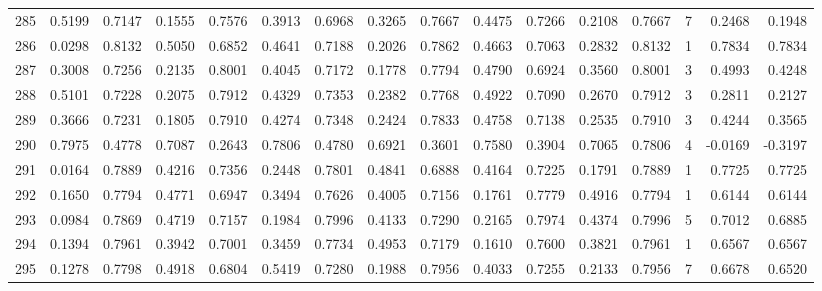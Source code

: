 \begin{tabular}{lrrrrrrrrrrrrrrr}
285 &      0.5199 &  0.7147 &  0.1555 &  0.7576 &  0.3913 &  0.6968 &  0.3265 &  0.7667 &  0.4475 &  0.7266 &   0.2108 &     0.7667 &      7 &                    0.2468 &                     0.1948 \\
286 &      0.0298 &  0.8132 &  0.5050 &  0.6852 &  0.4641 &  0.7188 &  0.2026 &  0.7862 &  0.4663 &  0.7063 &   0.2832 &     0.8132 &      1 &                    0.7834 &                     0.7834 \\
287 &      0.3008 &  0.7256 &  0.2135 &  0.8001 &  0.4045 &  0.7172 &  0.1778 &  0.7794 &  0.4790 &  0.6924 &   0.3560 &     0.8001 &      3 &                    0.4993 &                     0.4248 \\
288 &      0.5101 &  0.7228 &  0.2075 &  0.7912 &  0.4329 &  0.7353 &  0.2382 &  0.7768 &  0.4922 &  0.7090 &   0.2670 &     0.7912 &      3 &                    0.2811 &                     0.2127 \\
289 &      0.3666 &  0.7231 &  0.1805 &  0.7910 &  0.4274 &  0.7348 &  0.2424 &  0.7833 &  0.4758 &  0.7138 &   0.2535 &     0.7910 &      3 &                    0.4244 &                     0.3565 \\
290 &      0.7975 &  0.4778 &  0.7087 &  0.2643 &  0.7806 &  0.4780 &  0.6921 &  0.3601 &  0.7580 &  0.3904 &   0.7065 &     0.7806 &      4 &                   -0.0169 &                    -0.3197 \\
291 &      0.0164 &  0.7889 &  0.4216 &  0.7356 &  0.2448 &  0.7801 &  0.4841 &  0.6888 &  0.4164 &  0.7225 &   0.1791 &     0.7889 &      1 &                    0.7725 &                     0.7725 \\
292 &      0.1650 &  0.7794 &  0.4771 &  0.6947 &  0.3494 &  0.7626 &  0.4005 &  0.7156 &  0.1761 &  0.7779 &   0.4916 &     0.7794 &      1 &                    0.6144 &                     0.6144 \\
293 &      0.0984 &  0.7869 &  0.4719 &  0.7157 &  0.1984 &  0.7996 &  0.4133 &  0.7290 &  0.2165 &  0.7974 &   0.4374 &     0.7996 &      5 &                    0.7012 &                     0.6885 \\
294 &      0.1394 &  0.7961 &  0.3942 &  0.7001 &  0.3459 &  0.7734 &  0.4953 &  0.7179 &  0.1610 &  0.7600 &   0.3821 &     0.7961 &      1 &                    0.6567 &                     0.6567 \\
295 &      0.1278 &  0.7798 &  0.4918 &  0.6804 &  0.5419 &  0.7280 &  0.1988 &  0.7956 &  0.4033 &  0.7255 &   0.2133 &     0.7956 &      7 &                    0.6678 &                     0.6520 \\

\end{tabular}
